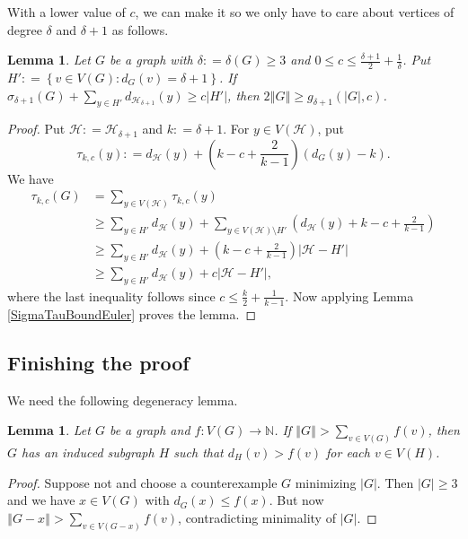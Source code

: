 \documentclass[12pt]{article}
\theoremstyle{plain}
\newtheorem{lem}[thm]{Lemma}
\theoremstyle{definition}
\theoremstyle{remark}
\newcommand{\fancy}[1]{\mathcal{#1}}
\newcommand{\IN}{\mathbb{N}}
\newcommand{\HH}{\fancy{H}}
\newcommand{\setb}[3]{\left\{ #1 \in #2 : #3 \right\}}
\newcommand{\card}[1]{\left|#1\right|}
\newcommand{\size}[1]{\left\Vert#1\right\Vert}
\newcommand{\func}[3]{#1\colon #2 \rightarrow #3}
\newcommand{\parens}[1]{\left( #1 \right)}
\newcommand{\DefinedAs}{\mathrel{\mathop:}=}
\begin{document}
With a lower value of $c$, we can make it so we only have to care about vertices of degree $\delta$ and $\delta + 1$ as follows.

\begin{lem}\label{SigmaTauBoundEulerRefined}
Let $G$ be a graph with $\delta \DefinedAs \delta(G) \ge 3$ and $0 \le c \le \frac{\delta + 1}{2} + \frac{1}{\delta}$.  Put $H' \DefinedAs \setb{v}{V(G)}{d_G(v) = \delta + 1}$.  If $\sigma_{\delta + 1}(G) +  \sum_{y \in H'} d_{\HH_{\delta + 1}}(y) \ge c\card{H'}$, then $2\size{G} \ge g_{\delta + 1}(\card{G}, c)$.	
\end{lem}
\begin{proof}
	Put $\HH \DefinedAs \HH_{\delta + 1}$ and $k \DefinedAs \delta + 1$.	For $y \in V(\HH)$, put 
	\[\tau_{k,c}(y) \DefinedAs d_{\HH}(y) + \parens{k-c + \frac{2}{k-1}}(d_G(y) - k).\]  We have 
	\begin{align*}
	\tau_{k,c}(G) &= \sum_{y \in V(\HH)} \tau_{k,c}(y)\\
	&\ge \sum_{y \in H'} d_{\HH}(y) + \sum_{y \in V(\HH) \setminus H'} \parens{d_{\HH}(y) + k-c + \frac{2}{k-1}}\\
	&\ge \sum_{y \in H'} d_{\HH}(y) + \parens{k-c + \frac{2}{k-1}}\card{\HH - H'}\\
	&\ge \sum_{y \in H'} d_{\HH}(y) + c\card{\HH - H'},
	\end{align*}
	where the last inequality follows since $c \le \frac{k}{2} + \frac{1}{k-1}$. Now applying Lemma \ref{SigmaTauBoundEuler} proves the lemma.
\end{proof}

\subsection{Finishing the proof}

\noindent We need the following degeneracy lemma.
\begin{lem}\label{DegenerateEuler}
Let $G$ be a graph and $\func{f}{V(G)}{\IN}$.  If $\size{G} > \sum_{v \in V(G)} f(v)$, then $G$ has an induced subgraph $H$ such that $d_H(v) > f(v)$ for each $v \in V(H)$.
\end{lem}
\begin{proof}
Suppose not and choose a counterexample $G$ minimizing $\card{G}$. Then $\card{G} \ge 3$ and we have $x \in V(G)$ with $d_G(x) \leq f(x)$. But now $\size{G-x} > \sum_{v \in V(G-x)} f(v)$, contradicting minimality of $\card{G}$.
\end{proof}
\end{document}
